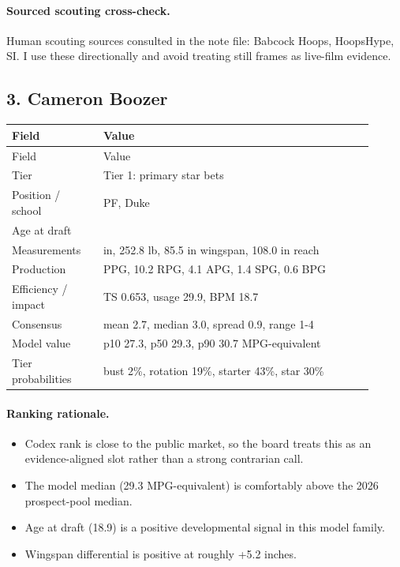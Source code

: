 \documentclass[11pt]{article}
\begin{document}
\paragraph{Sourced scouting cross-check.}
Human scouting sources consulted in the note file: Babcock Hoops, HoopsHype, SI. I use these directionally and avoid treating still frames as live-film evidence.


\subsection{3. Cameron Boozer}
\begin{center}
\scriptsize
\begin{longtable}{@{}>{\raggedright\arraybackslash}p{0.230\linewidth}>{\raggedright\arraybackslash}p{0.680\linewidth}@{}}
\toprule
Field & Value \\
\midrule
\endfirsthead
\toprule
Field & Value \\
\midrule
\endhead
Tier & Tier 1: primary star bets \\
Position / school & PF, Duke \\
Age at draft & 18.9 \\
Measurements & 80.2 in, 252.8 lb, 85.5 in wingspan, 108.0 in reach \\
Production & 22.5 PPG, 10.2 RPG, 4.1 APG, 1.4 SPG, 0.6 BPG \\
Efficiency / impact & TS 0.653, usage 29.9, BPM 18.7 \\
Consensus & mean 2.7, median 3.0, spread 0.9, range 1-4 \\
Model value & p10 27.3, p50 29.3, p90 30.7 MPG-equivalent \\
Tier probabilities & bust 2\%, rotation 19\%, starter 43\%, star 30\% \\
\bottomrule
\end{longtable}
\end{center}

\paragraph{Ranking rationale.}
\begin{itemize}[leftmargin=*]
\item Codex rank is close to the public market, so the board treats this as an evidence-aligned slot rather than a strong contrarian call.
\item The model median (29.3 MPG-equivalent) is comfortably above the 2026 prospect-pool median.
\item Age at draft (18.9) is a positive developmental signal in this model family.
\item Wingspan differential is positive at roughly +5.2 inches.
\end{itemize}
\end{document}
